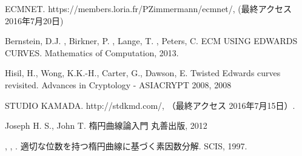 \documentclass[openany,11pt,papersize]{jsbook}
\begin{document}
\begin{appendix}
\end{appendix}



\begin{thebibliography}{9}

\newblock ECMNET.
\newblock https://members.loria.fr/PZimmermann/ecmnet/, (最終アクセス 2016年7月20日)

\newblock Bernstein, D.J. , Birkner, P. , Lange, T. , Peters, C.
\newblock ECM USING EDWARDS CURVES.
\newblock Mathematics of Computation, 2013.

\newblock Hisil, H., Wong, K.K.-H., Carter, G., Dawson, E.
\newblock Twisted Edwards curves revisited.
\newblock Advances in Cryptology - ASIACRYPT 2008, 2008

\newblock STUDIO KAMADA. 
\newblock http://stdkmd.com/, （最終アクセス 2016年7月15日）.

\newblock Joseph H. S., John T.
\newblock 楕円曲線論入門
\newblock 丸善出版, 2012

{}{},
 {}{},
 {}{}.
\newblock 適切な位数を持つ楕円曲線に基づく素因数分解.
\newblock SCIS, 1997.
\end{thebibliography}
\end{document}
